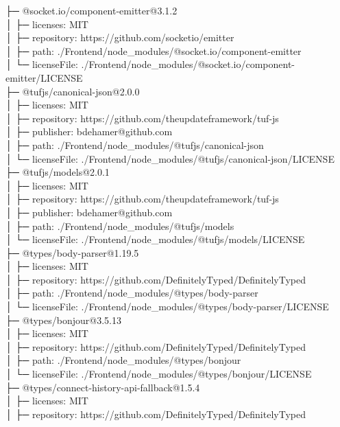├─ @socket.io/component-emitter@3.1.2\\
│  ├─ licenses: MIT\\
│  ├─ repository: https://github.com/socketio/emitter\\
│  ├─ path: ./Frontend/node\_modules/@socket.io/component-emitter\\
│  └─ licenseFile: ./Frontend/node\_modules/@socket.io/component-emitter/LICENSE\\
├─ @tufjs/canonical-json@2.0.0\\
│  ├─ licenses: MIT\\
│  ├─ repository: https://github.com/theupdateframework/tuf-js\\
│  ├─ publisher: bdehamer@github.com\\
│  ├─ path: ./Frontend/node\_modules/@tufjs/canonical-json\\
│  └─ licenseFile: ./Frontend/node\_modules/@tufjs/canonical-json/LICENSE\\
├─ @tufjs/models@2.0.1\\
│  ├─ licenses: MIT\\
│  ├─ repository: https://github.com/theupdateframework/tuf-js\\
│  ├─ publisher: bdehamer@github.com\\
│  ├─ path: ./Frontend/node\_modules/@tufjs/models\\
│  └─ licenseFile: ./Frontend/node\_modules/@tufjs/models/LICENSE\\
├─ @types/body-parser@1.19.5\\
│  ├─ licenses: MIT\\
│  ├─ repository: https://github.com/DefinitelyTyped/DefinitelyTyped\\
│  ├─ path: ./Frontend/node\_modules/@types/body-parser\\
│  └─ licenseFile: ./Frontend/node\_modules/@types/body-parser/LICENSE\\
├─ @types/bonjour@3.5.13\\
│  ├─ licenses: MIT\\
│  ├─ repository: https://github.com/DefinitelyTyped/DefinitelyTyped\\
│  ├─ path: ./Frontend/node\_modules/@types/bonjour\\
│  └─ licenseFile: ./Frontend/node\_modules/@types/bonjour/LICENSE\\
├─ @types/connect-history-api-fallback@1.5.4\\
│  ├─ licenses: MIT\\
│  ├─ repository: https://github.com/DefinitelyTyped/DefinitelyTyped\\
